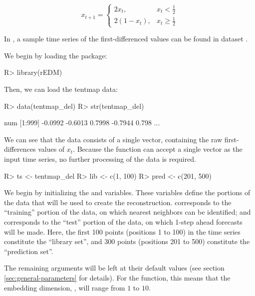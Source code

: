 \documentclass[article]{jss}
\begin{document}
\begin{equation*}
x_{t+1} =
\begin{cases}
2x_t, & x_t < \frac{1}{2}\\
2(1-x_t), & x_t \ge \frac{1}{2}
\end{cases}
\end{equation*}

In , a sample time series of the first-differenced values can be found in dataset .

We begin by loading the  package:
\begin{Schunk}
\begin{Sinput}
R> library(rEDM)
\end{Sinput}
\end{Schunk}

Then, we can load the tentmap data:
\begin{Schunk}
\begin{Sinput}
R> data(tentmap_del)
R> str(tentmap_del)
\end{Sinput}
\begin{Soutput}
 num [1:999] -0.0992 -0.6013 0.7998 -0.7944 0.798 ...
\end{Soutput}
\end{Schunk}

We can see that the data consists of a single vector, containing the raw first-differences values of $x_t$. Because the  function can accept a single vector as the input time series, no further processing of the data is required.

\begin{Schunk}
\begin{Sinput}
R> ts <- tentmap_del
R> lib <- c(1, 100)
R> pred <- c(201, 500)
\end{Sinput}
\end{Schunk}

We begin by initializing the  and  variables. These variables define the portions of the data that will be used to create the reconstruction.  corresponds to the ``training'' portion of the data, on which nearest neighbors can be identified; and  corresponds to the ``test'' portion of the data, on which 1-step ahead forecasts will be made. Here, the first 100 points (positions 1 to 100) in the time series constitute the ``library set'', and 300 points (positions 201 to 500) constitute the ``prediction set''.

The remaining arguments will be left at their default values (see section \ref{sec:general-parameters} for details). For the  function, this means that the embedding dimension, , will range from $1$ to $10$.
\end{document}
